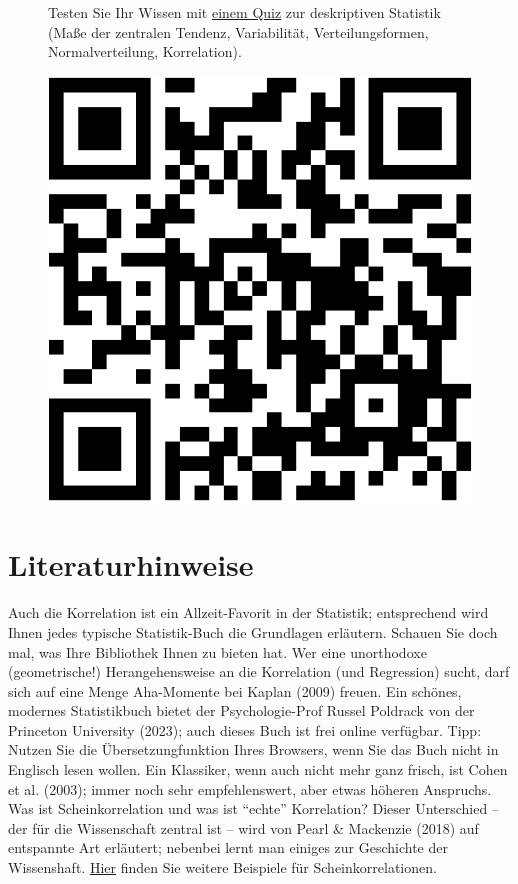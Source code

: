 \documentclass[
  letterpaper,
]{scrbook}
\theoremstyle{definition}
\theoremstyle{definition}
\theoremstyle{definition}
\theoremstyle{remark}
\begin{document}
\begin{figure}

\begin{minipage}{0.80\linewidth}
Testen Sie Ihr Wissen mit
\href{https://forms.gle/w7eTW3ftKy8Hv3nw8}{einem Quiz} zur deskriptiven
Statistik (Maße der zentralen Tendenz, Variabilität, Verteilungsformen,
Normalverteilung, Korrelation).\end{minipage}%
%
\begin{minipage}{0.20\linewidth}

\begin{center}
\includegraphics[width=0.75\linewidth,height=\textheight,keepaspectratio]{070-zusammenhaenge_files/figure-pdf/unnamed-chunk-31-1.pdf}
\end{center}

\end{minipage}%

\end{figure}%

\section{Literaturhinweise}\label{literaturhinweise-6}

Auch die Korrelation ist ein Allzeit-Favorit in der Statistik;
entsprechend wird Ihnen jedes typische Statistik-Buch die Grundlagen
erläutern. Schauen Sie doch mal, was Ihre Bibliothek Ihnen zu bieten
hat. Wer eine unorthodoxe (geometrische!) Herangehensweise an die
Korrelation (und Regression) sucht, darf sich auf eine Menge Aha-Momente
bei Kaplan (2009) freuen. Ein schönes, modernes Statistikbuch bietet der
Psychologie-Prof Russel Poldrack von der Princeton University (2023);
auch dieses Buch ist frei online verfügbar. Tipp: Nutzen Sie die
Übersetzungfunktion Ihres Browsers, wenn Sie das Buch nicht in Englisch
lesen wollen. Ein Klassiker, wenn auch nicht mehr ganz frisch, ist Cohen
et al. (2003); immer noch sehr empfehlenswert, aber etwas höheren
Anspruchs. Was ist Scheinkorrelation und was ist \enquote{echte}
Korrelation? Dieser Unterschied -- der für die Wissenschaft zentral ist
-- wird von Pearl \& Mackenzie (2018) auf entspannte Art erläutert;
nebenbei lernt man einiges zur Geschichte der Wissenshaft.
\href{https://scheinkorrelation.jimdofree.com/}{Hier} finden Sie weitere
Beispiele für Scheinkorrelationen.
\end{document}
